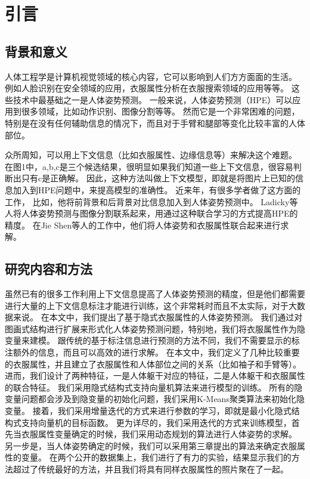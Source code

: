 
\chapter{引言}
\label{chap:intro}

\section{背景和意义}
人体工程学是计算机视觉领域的核心内容，它可以影响到人们方方面面的生活。
例如人脸识别在安全领域的应用，衣服属性分析在衣服搜索领域的应用等等。
这些技术中最基础之一是人体姿势预测。
一般来说，人体姿势预测（HPE）可以应用到很多领域，比如动作识别、图像分割等等。
然而它是一个非常困难的问题，特别是在没有任何辅助信息的情况下，而且对于手臂和腿部等变化比较丰富的人体部位。

众所周知，可以用上下文信息（比如衣服属性、边缘信息等）来解决这个难题。
在图1中，a,b,c是三个候选结果，很明显如果我们知道一些上下文信息，很容易判断出只有c是正确解。
因此，这种方法叫做上下文模型，即就是将图片上已知的信息加入到HPE问题中，来提高模型的准确性。
近来年，有很多学者做了这方面的工作\cite{Zhou:FMF01}， 比如\cite{deeppose}，他将前背景和后背景对比信息加入到人体姿势预测中。
Ladicky\cite{cvpr09}等人将人体姿势预测与图像分割联系起来，用通过这种联合学习的方式提高HPE的精度。
在Jie Shen\cite{shen2014unified}等人的工作中，他们将人体姿势和衣服属性联合起来进行求解\cite{cvpr09}。

\section{研究内容和方法}
虽然已有的很多工作利用上下文信息提高了人体姿势预测的精度，但是他们都需要进行大量的上下文信息标注才能进行训练，这个非常耗时而且不太实际，对于大数据来说。
在本文中，我们提出了基于隐式衣服属性的人体姿势预测。
我们通过对图画式结构进行扩展来形式化人体姿势预测问题，特别地，我们将衣服属性作为隐变量来建模。
跟传统的基于标注信息进行预测的方法不同，我们不需要显示的标注额外的信息，而且可以高效的进行求解。
在本文中，我们定义了几种比较重要的衣服属性，并且建立了衣服属性和人体部位之间的关系（比如袖子和手臂等）。
进而，我们设计了两种特征，一是人体躯干对应的特征，二是人体躯干和衣服属性的联合特征。
我们采用隐式结构式支持向量机算法来进行模型的训练。
所有的隐变量问题都会涉及到隐变量的初始化问题，我们采用K-Means聚类算法来初始化隐变量。
接着，我们采用增量迭代的方式来进行参数的学习，即就是最小化隐式结构式支持向量机的目标函数。
更为详尽的，我们采用迭代的方式来训练模型，首先当衣服属性变量确定的时候，我们采用动态规划的算法进行人体姿势的求解。
另一步是，当人体姿势确定的时候，我们可以采用第三章提出的算法来确定衣服属性的变量。
在两个公开的数据集上，我们进行了有力的实验，结果显示我们的方法超过了传统最好的方法，并且我们将具有同样衣服属性的照片聚在了一起。

